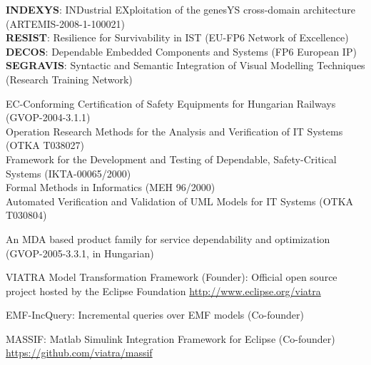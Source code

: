 \documentclass{xetexCV}
\begin{document}

\textbf{INDEXYS}: INDustrial EXploitation of the genesYS
cross-domain architecture (ARTEMIS-2008-1-100021)  \\
\textbf{RESIST}: Resilience for Survivability in IST (EU-FP6
Network of Excellence)  \\
\textbf{DECOS}: Dependable Embedded Components and Systems (FP6
European IP) \\
\textbf{SEGRAVIS}: Syntactic and Semantic Integration of
Visual Modelling Techniques (Research Training Network) 


EC-Conforming  Certification of Safety Equipments for Hungarian
Railways (GVOP-2004-3.1.1) \\
Operation Research Methods  for the Analysis and Verification
of IT Systems (OTKA T038027) \\ 
Framework  for the Development and Testing of Dependable,
Safety-Critical Systems (IKTA-00065/2000) \\  
Formal Methods in Informatics (MEH 96/2000)  \\
Automated Verification  and Validation of UML Models for IT
Systems (OTKA T030804) 


An MDA based product family for service dependability and
optimization (GVOP-2005-3.3.1, in Hungarian)  




VIATRA  Model Transformation Framework (Founder): Official open source project hosted by the Eclipse Foundation \newline
\url{http://www.eclipse.org/viatra} 

EMF-IncQuery:  Incremental queries over EMF models (Co-founder) 

MASSIF:  Matlab Simulink Integration Framework for Eclipse (Co-founder) \newline 
\url{https://github.com/viatra/massif} 
\end{document}
